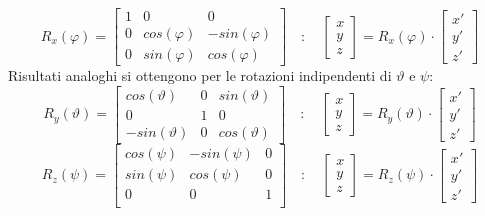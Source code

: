 \documentclass[11pt]{article}
\begin{document}
\begin{equation}\label{rx}
R_x(\varphi)=
\begin{bmatrix}
1 & 0 & 0\\
0 & cos(\varphi) & -sin(\varphi)\\
0 & sin(\varphi) & cos(\varphi)
\end{bmatrix}
\quad : \quad
\begin{bmatrix}
x \\
y \\
z 
\end{bmatrix}
=R_x(\varphi)\cdot\begin{bmatrix}
x' \\
y' \\
z' 
\end{bmatrix}
\end{equation}
Risultati analoghi si ottengono per le rotazioni indipendenti di $\vartheta$ e $\psi$:
\begin{equation}\label{ry}
R_y(\vartheta)=
\begin{bmatrix}
cos(\vartheta) & 0 & sin(\vartheta)\\
0 & 1 & 0\\
-sin(\vartheta) & 0 & cos(\vartheta)
\end{bmatrix}
\quad : \quad
\begin{bmatrix}
x \\
y \\
z 
\end{bmatrix}
=R_y(\vartheta)\cdot\begin{bmatrix}
x' \\
y' \\
z' 
\end{bmatrix}
\end{equation}
\begin{equation}\label{rz}
R_z(\psi)=
\begin{bmatrix}
cos(\psi) & -sin(\psi) & 0\\
sin(\psi) & cos(\psi) & 0\\
0 & 0 & 1\\
\end{bmatrix}
\quad : \quad
\begin{bmatrix}
x \\
y \\
z 
\end{bmatrix}
=R_z(\psi)\cdot\begin{bmatrix}
x' \\
y' \\
z' 
\end{bmatrix}
\end{equation}
\end{document}
